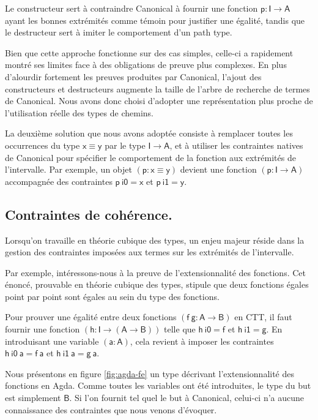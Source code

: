 \documentclass[11pt]{article}
\begin{document}
Le constructeur sert à contraindre Canonical à fournir une fonction $\mathsf{p : I \to A}$ ayant les bonnes extrémités comme témoin pour justifier une égalité, 
tandis que le destructeur sert à imiter le comportement d'un path type.

Bien que cette approche fonctionne sur des cas simples, celle-ci a rapidement montré ses limites face à des obligations de preuve plus complexes.
En plus d'alourdir fortement les preuves produites par Canonical, 
l'ajout des constructeurs et destructeurs augmente la taille de l'arbre de recherche de termes de Canonical. 
Nous avons donc choisi d'adopter une représentation plus proche de l'utilisation réelle des types de chemins.

La deuxième solution que nous avons adoptée consiste à remplacer toutes les occurrences du type $\mathsf{x \equiv y}$ par le type $\mathsf{I \to A}$, 
et à utiliser les contraintes natives de Canonical pour spécifier le comportement de la fonction aux extrémités de l'intervalle.
Par exemple, un objet $\mathsf{(p : x \equiv y)}$ devient une fonction $\mathsf{(p : I \to A)}$ accompagnée des contraintes $\mathsf{p~i0 = x}$ et $\mathsf{p~i1 = y}$.

\subsection{Contraintes de cohérence.}
Lorsqu'on travaille en théorie cubique des types, un enjeu majeur réside dans la gestion des contraintes imposées aux termes sur les extrémités de l'intervalle.

Par exemple, intéressons-nous à la preuve de l'extensionnalité des fonctions. Cet énoncé, prouvable en théorie cubique des types, stipule que deux fonctions égales point par point sont égales au sein du type des fonctions.

Pour prouver une égalité entre deux fonctions $\mathsf{(f~g : A \to B)}$ en CTT, 
il faut fournir une fonction $\mathsf{(h : I \to (A \to B))}$ telle que $\mathsf{h~i0 = f}$ et $\mathsf{h~i1 = g}$.
En introduisant une variable $\mathsf{(a : A)}$, cela revient à imposer les contraintes $\mathsf{h~i0~a = f~a}$ et $\mathsf{h~i1~a = g~a}$.

Nous présentons en figure \ref{fig:agda-fe} un type décrivant l'extensionnalité des fonctions en Agda.
Comme toutes les variables ont été introduites, le type du but est simplement $\mathsf{B}$.
Si l'on fournit tel quel le but à Canonical, celui-ci n'a aucune connaissance des contraintes que nous venons d'évoquer.
\end{document}
